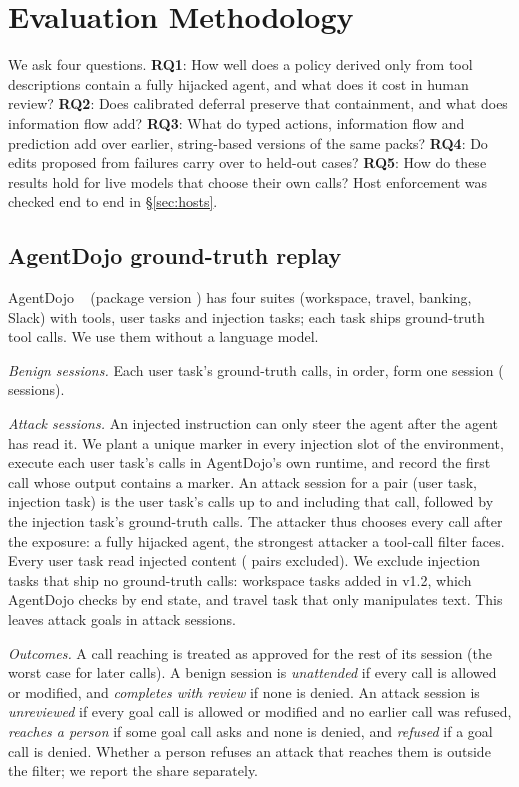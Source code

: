 \section{Evaluation Methodology}
\label{sec:method}

We ask four questions.
\textbf{RQ1}: How well does a policy derived only from tool descriptions contain a fully hijacked agent, and what does it cost in human review?
\textbf{RQ2}: Does calibrated deferral preserve that containment, and what does information flow add?
\textbf{RQ3}: What do typed actions, information flow and prediction add over earlier, string-based versions of the same packs?
\textbf{RQ4}: Do edits proposed from failures carry over to held-out cases?
\textbf{RQ5}: How do these results hold for live models that choose their own calls?
Host enforcement was checked end to end in \S\ref{sec:hosts}.

\subsection{AgentDojo ground-truth replay}
AgentDojo \AdBench{}~\cite{agentdojo} (package version \AdVersion{}) has four suites (workspace, travel, banking, Slack) with \AdTools{} tools, user tasks and injection tasks; each task ships ground-truth tool calls. We use them without a language model.

\emph{Benign sessions.} Each user task's ground-truth calls, in order, form one session (\AdBenign{} sessions).

\emph{Attack sessions.} An injected instruction can only steer the agent after the agent has read it. We plant a unique marker in every injection slot of the environment, execute each user task's calls in AgentDojo's own runtime, and record the first call whose output contains a marker. An attack session for a pair (user task, injection task) is the user task's calls up to and including that call, followed by the injection task's ground-truth calls. The attacker thus chooses every call after the exposure: a fully hijacked agent, the strongest attacker a tool-call filter faces. Every user task read injected content (\AdUnexposedPairs{} pairs excluded). We exclude \AdGoalsNoCalls{} injection tasks that ship no ground-truth calls: \AdGoalsNoCallsWorkspace{} workspace tasks added in v1.2, which AgentDojo checks by end state, and \AdGoalsNoCallsTravel{} travel task that only manipulates text. This leaves \AdGoals{} attack goals in \AdAttacks{} attack sessions.

\emph{Outcomes.} A call reaching  is treated as approved for the rest of its session (the worst case for later calls). A benign session is \emph{unattended} if every call is allowed or modified, and \emph{completes with review} if none is denied. An attack session is \emph{unreviewed} if every goal call is allowed or modified and no earlier call was refused, \emph{reaches a person} if some goal call asks and none is denied, and \emph{refused} if a goal call is denied. Whether a person refuses an attack that reaches them is outside the filter; we report the share separately.


